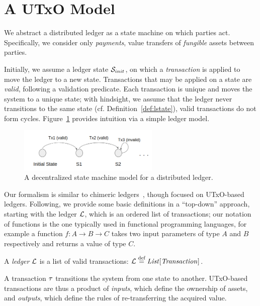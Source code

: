 \section{A UTxO Model}\label{sec:utxo_model}

We abstract a distributed ledger as a state machine on which parties act.
Specifically, we consider only \emph{payments}, \ie value transfers of
\emph{fungible} assets between parties.

Initially, we assume a ledger state $\mathcal{S}_{init}$, on which a
\emph{transaction} is applied to move the ledger to a new state. Transactions
that may be applied on a state are \emph{valid}, following a validation
predicate. Each transaction is unique and moves the system to a unique state;
with hindsight, we assume that the ledger never transitions to the same state
(cf. Definition~\ref{def:lstate}), \ie valid transactions do not form cycles.
Figure~\ref{fig:state-machine} provides intuition via a simple ledger model.

\begin{figure}
    \centering

    \includegraphics[width=0.6\textwidth,keepaspectratio]{figures/utxo_growth/state_machine.png}
    \caption{A decentralized state machine model for a distributed ledger.}
    \label{fig:state-machine}
\end{figure}

Our formalism is similar to chimeric ledgers~\cite{chimeric}, though focused on
UTxO-based ledgers. Following, we provide some basic definitions in a
``top-down'' approach, starting with the ledger $\mathcal{L}$, which is an ordered
list of transactions; our notation of functions is the one typically
used in functional programming languages, for example a function $f : A
\rightarrow B
\rightarrow C$ takes two input parameters of type $A$ and $B$ respectively and
returns a value of type $C$.

\begin{definition}
    A \emph{ledger} $\mathcal{L}$ is a list of valid transactions: $\mathcal{L} \stackrel{\textrm{\scriptsize def}}{=} \mathit{List}[\mathit{Transaction}]$.
\end{definition}

A transaction $\tau$ transitions the system from one state to another.
UTxO-based transactions are thus a product of \emph{inputs}, which define the
ownership of assets, and \emph{outputs}, which define the rules of
re-transferring the acquired value.

